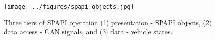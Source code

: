 \begin{figure}[t]
    \centering
    \texttt{[image: ../figures/spapi-objects.jpg]}
    \caption{Three tiers of SPAPI operation (1) presentation - SPAPI objects, (2) data access - CAN signals, and (3) data - vehicle states.}
    \vspace{-0.4cm}
    \label{fig:spapi-objects}
\end{figure}
